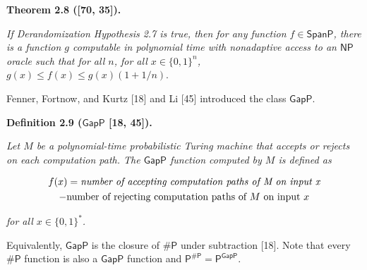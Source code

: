 

\par\medskip\noindent\textbf{
\textbf{Theorem 2.8}\textbf{ }([70, 35])\textbf{.}
}\par



\emph{If Derandomization Hypothesis 2.7 is true,
then for any function $f\in\mathsf{SpanP}$,
there is a function $g$ computable in polynomial time with
nonadaptive access to an $\mathsf{NP}$ oracle such that for all
$n$, for all $x\in\{0,1\}^{n}$,
$g(x)\leq f(x)\leq g(x)(1+1/n).$}\par






Fenner, Fortnow, and Kurtz [18] and Li [45] introduced the class $\mathsf{GapP}$.\par





\par\medskip\noindent\textbf{
\textbf{Definition 2.9}\textbf{ }($\mathsf{GapP}$ [18, 45])\textbf{.}
}\par



\emph{Let $M$ be a polynomial-time probabilistic Turing machine that accepts or rejects on each computation path. The $\mathsf{GapP}$ function computed by $M$ is defined as}\par


\[\begin{gathered}
\displaystyle f(x) \displaystyle= \emph{number of accepting computation paths of M on input x} \\
\displaystyle-\textrm{number of rejecting computation paths of $M$ on input $x$}
\end{gathered}\]


\emph{for all $x\in\{0,1\}^{*}$.}\par






Equivalently, $\mathsf{GapP}$ is the closure of ${\mathsf{\#}\mathsf{P}}$ under subtraction [18]. Note that every ${\mathsf{\#}\mathsf{P}}$ function is also a $\mathsf{GapP}$ function and $\mathsf{P}^{\mathsf{\#}\mathsf{P}}=\mathsf{P}^{\mathsf{GapP}}$.\par





